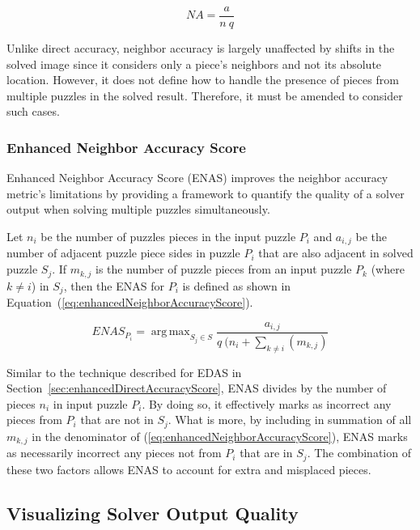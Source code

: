 \documentclass{report}
\def\eref#1{(\ref{#1})}
\DeclareMathOperator*{\argmax}{arg\,max} %
\begin{document}
\begin{equation} \label{eq:neighborAccuracy}
NA = \frac{a}{n~q}
\end{equation}

Unlike direct accuracy, neighbor accuracy is largely unaffected by shifts in the solved image since it considers only a piece's neighbors and not its absolute location.  However, it does not define how to handle the presence of pieces from multiple puzzles in the solved result.  Therefore, it must be amended to consider such cases.

\subsubsection{Enhanced Neighbor Accuracy Score}\label{sec:enhancedNeighborAccuracyScore}

Enhanced Neighbor Accuracy Score (ENAS) improves the neighbor accuracy metric's limitations by providing a framework to quantify the quality of a solver output when solving multiple puzzles simultaneously. 

Let $n_i$ be the number of puzzles pieces in the input puzzle $P_i$ and $a_{i,j}$ be the number of adjacent puzzle piece sides in puzzle $P_i$ that are also adjacent in solved puzzle $S_j$.  If $m_{k,j}$ is the number of puzzle pieces from an input puzzle $P_k$ (where $k \ne i$) in $S_j$, then the ENAS for $P_i$ is defined as shown in Equation~\eref{eq:enhancedNeighborAccuracyScore}.

\begin{equation} \label{eq:enhancedNeighborAccuracyScore}
ENAS_{P_i} = \argmax_{S_j \in S}\frac{a_{i,j}}{q ~ (n_i + \sum_{k \ne i}(m_{k,j})}
\end{equation}

Similar to the technique described for EDAS in Section~\ref{sec:enhancedDirectAccuracyScore}, ENAS divides by the number of pieces $n_i$ in input puzzle $P_i$.  By doing so, it effectively marks as incorrect any pieces from $P_i$ that are not in $S_j$.  What is more, by including in summation of all $m_{k,j}$ in the denominator of \eref{eq:enhancedNeighborAccuracyScore}, ENAS marks as necessarily incorrect any pieces not from $P_i$ that are in $S_j$.  The combination of these two factors allows ENAS to account for extra and misplaced pieces.

\subsection{Visualizing Solver Output Quality}\label{sec:visualizingSolverAccuracy}
\end{document}
